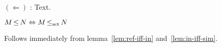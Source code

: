 
$(\Leftarrow)$ : Text.

\begin{corollary}
$M \operatorname{\leq} N \Leftrightarrow M \operatorname{\operatorname{\leq}_{\textrm{set}}} N$
\end{corollary}

Follows immediately from lemma~\ref{lem:ref-iff-in} and~\ref{lem:in-iff-sim}.

